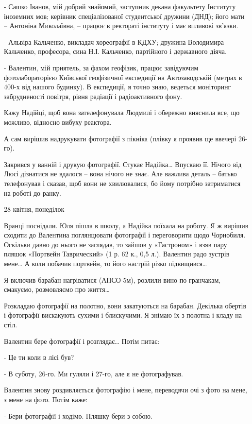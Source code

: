 - Сашко Іванов, мій добрий знайомий, заступник декана факультету Інституту
іноземних мов; керівник спеціалізованої студентської дружини (ДНД); його мати –
Антоніна Миколаївна, – працює в ректораті інституту і має впливові зв’язки.

- Альвіра Кальченко, викладач хореографії в КДХУ; дружина Володимира Кальченко,
професора, сина Н.І. Кальченко, партійного і державного діяча.

- Валентин, мій приятель, за фахом геофізик, працює завідуючим фотолабораторією
Київської геофізичної експедиції на Автозаводській (метрах в 400-х від нашого
будинку). В експедиції, я точно знаю, ведеться моніторинг забрудненості
повітря, рівня радіації і радіоактивного фону.

Кажу Надійці, щоб вона зателефонувала Людмилі і обережно вияснила все, що
можливо, відносно вибуху реактора. 

А сам вирішив надрукувати фотографії з пікніка (плівку я проявив ще ввечері
26-го).

Закрився у ванній і друкую фотографії. Стукає Надійка… Впускаю її. Нічого від
Люсі дізнатися не вдалося – вона нічого не знає. Але важлива деталь – батько
телефонував і сказав, щоб вони не хвилювалися, бо йому потрібно затриматися на
роботі до ранку. 

28 квітня, понеділок 

Вранці поснідали. Юля пішла в школу, а Надійка поїхала на роботу. Я ж вирішив
сходити до Валентина поглянцювати фотографії і переговорити щодо Чорнобиля.
Оскільки давно до нього не заглядав, то зайшов у «Гастроном» і взяв пару пляшок
«Портвейн Таврический» (1 р. 62 к., 0,5 л.). Валентин радо зустрів мене… А коли
побачив портвейн, то його настрій різко підвищився… 

Я включив барабан нагріватися (АПСО-5м), розлили вино по гранчакам, смакуємо,
розмовляємо про життя… 

Розкладаю фотографії на полотно, вони закатуються на барабан. Декілька обертів
і фотографії вискакують сухими і блискучими. Я знімаю їх з полотна і кладу на
стіл. 

Валентин бере фотографії і розглядає… Потім питає: 

- Це ти коли в лісі був?

- В суботу, 26-го. Ми гуляли і 27-го, але я не фотографував.

Валентин знову роздивляється фотографію і мене, переводячи очі з фото на мене,
з мене на фото. Потім каже:

- Бери фотографії і ходімо. Пляшку бери з собою.


